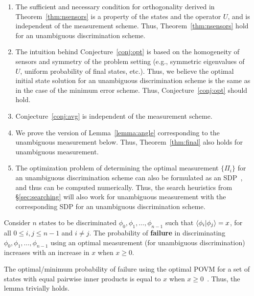 \begin{enumerate}
\item
The sufficient and necessary condition for orthogonality derived in Theorem~\ref{thm:nsensors} is a property of the states and the operator $U$, 
and is independent of the measurement scheme. Thus, Theorem~\ref{thm:nsensors}
hold for an unambiguous discrimination scheme.

\item
The intuition behind Conjecture~\ref{conj:opt} is  based on the homogeneity of
sensors and symmetry of the problem setting (e.g., symmetric eigenvalues of 
$U$, uniform probability of final states, etc.). Thus, we believe the optimal
initial state solution for an unambiguous discrimination scheme is the same as in
the case of the minimum error scheme. Thus, Conjecture~\ref{conj:opt} should hold.

\item 
Conjecture~\ref{conj:avg} is independent of the measurement scheme.

\item 
We prove the version of Lemma~\ref{lemma:angle} corresponding to the unambiguous measurement below. Thus, Theorem~\ref{thm:final} also holds for unambiguous measurement. 

\item 
The optimization problem of determining the optimal measurement $\{\Pi_i\}$ for 
an unambiguous discrimination scheme can also be formulated as an SDP~\cite{Bae_2015}, 
and thus can be computed numerically. Thus, the search heuristics from \S\ref{sec:searching} will also work for unambiguous measurement with the 
corresponding SDP for an unambiguous discrimination scheme.

\end{enumerate}

\begin{lem-prf}
Consider $n$ states to be discriminated $\phi_0, \phi_1, \ldots, \phi_{n-1}$ 
such that $\bra{\phi_i}\ket{\phi_j} = x$,
for all $0 \leq i, j \leq n-1$ and $i \neq j$. 
The probability of {\bf failure} in discriminating 
$\phi_0, \phi_1, \ldots, \phi_{n-1}$ using an optimal measurement (for unambiguous
discrimination) 
increases with an increase in $x$ when $x \geq 0$.
\label{lemma:unambiguous}
\end{lem-prf}
\begin{prf}
The optimal/minimum probability of failure using the optimal POVM for a set of states with equal pairwise inner products is equal to $x$ when $x \geq 0$~\cite{quantum_pyramid}.
Thus, the lemma trivially holds. 
\end{prf}


